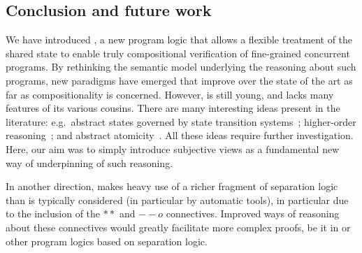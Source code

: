 \subsection*{Conclusion and future work}

We have introduced \colosl, a new program logic that allows a flexible
treatment of the shared state to enable truly compositional
verification of fine-grained concurrent programs. By rethinking the
semantic model underlying the reasoning about such programs, new
paradigms have emerged that improve over the state of the art as far
as compositionality is concerned. However, \colosl is still young, and
lacks many features of its various cousins.  There are many
interesting ideas present in the literature: e.g.\ abstract states
governed by state transition systems~\cite{caresl}; higher-order
reasoning~\cite{icap}; and abstract atomicity~\cite{tada}. All these
ideas require further investigation. Here, our aim was to simply
introduce subjective views as a fundamental new way of underpinning of
such reasoning.

In another direction, \colosl makes heavy use of a richer fragment
of separation logic than is typically considered (in particular by
automatic tools), in particular due to the inclusion of the $**$ and
$--o$ connectives. Improved ways of reasoning about these connectives
would greatly facilitate more complex proofs, be it in \colosl or
other program logics based on separation logic.
